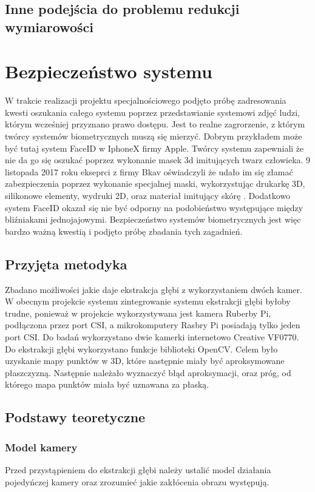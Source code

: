 \documentclass{article}
\begin{document}
\subsection{Inne podejścia do problemu redukcji wymiarowości}


\newpage

\section{Bezpieczeństwo systemu}
W trakcie realizacji projektu specjalnościowego podjęto próbę zadresowania kwesti oszukania całego systemu poprzez przedstawianie systemowi zdjęć ludzi, którym wcześniej przyznano prawo dostępu. Jest to realne zagrorzenie, z którym twórcy systemów biometrycznych muszą się mierzyć. Dobrym przykładem może być tutaj system FaceID w IphoneX firmy Apple. Twórcy systemu zapewniali że nie da go się oszukać poprzez wykonanie masek 3d imitujących twarz człowieka. 9 listopada 2017 roku ekseprci z firmy Bkav oświadczyli że udało im się złamać zabezpieczenia poprzez wykonanie specjalnej maski, wykorzystując drukarkę 3D, silikonowe elementy, wydruki 2D, oraz materiał imitujący skórę \cite{FaceID hacked}. Dodatkowo system FaceID okazał się nie być odporny na podobieństwo występujące między bliźniakami jednojajowymi. Bezpieczeństwo systemów biometrycznych jest więc bardzo ważną kwestią i podjęto próbę zbadania tych zagadnień.

\subsection{Przyjęta metodyka}
Zbadano możliwości jakie daje ekstrakcja głębi z wykorzystaniem dwóch kamer. W obecnym projekcie systemu zintegrowanie systemu ekstrakcji głębi byłoby trudne, ponieważ w projekcie wykorzystywana jest kamera Ruberby Pi, podłączona przez port CSI, a mikrokomputery Rasbry Pi posiadają tylko jeden port CSI. Do badań wykorzystano dwie kamerki internetowo Creative VF0770. Do ekstrakcji głębi wykorzystano funkcje biblioteki OpenCV. Celem było uzyskanie mapy punktów w 3D, które następnie miały być aproksymowane płaszczyzną. Następnie należało wyznaczyć błąd aproksymacji, oraz próg, od którego mapa punktów miała być uznawana za płaską.

\subsection{Podstawy teoretyczne}

\subsubsection{Model kamery}
Przed przystąpieniem do ekstrakcji głębi należy ustalić model działania pojedyńczej kamery oraz zrozumieć jakie zakłócenia obrazu występują.
\end{document}
